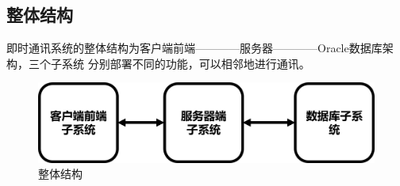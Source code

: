     \subsection{整体结构}
        即时通讯系统的整体结构为客户端前端————服务器————Oracle数据库架构，三个子系统
        分别部署不同的功能，可以相邻地进行通讯。
        \begin{figure}[h]
            \centering
            \includegraphics[scale=0.4]{OutlineDesign/figures/整体结构.png}
            \caption{整体结构}
            \label{fig:server_flow}
        \end{figure}
